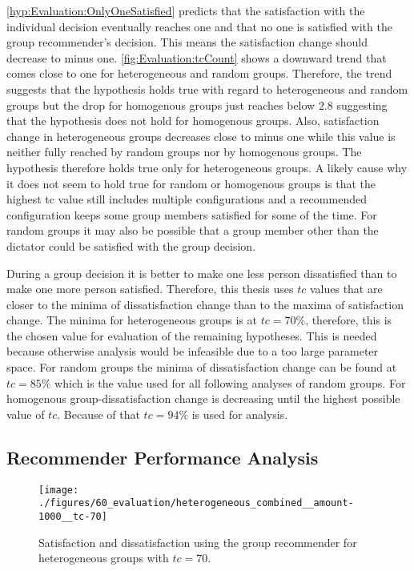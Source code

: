 \autoref{hyp:Evaluation:OnlyOneSatisfied} predicts that the satisfaction with the individual decision eventually reaches one and that no one is satisfied with the group recommender's decision. This means the satisfaction change should decrease to minus one. \autoref{fig:Evaluation:tcCount} shows a downward trend that comes close to one for heterogeneous and random groups. Therefore, the trend suggests that the hypothesis holds true with regard to heterogeneous and random groups but the drop for homogenous groups just reaches below $2.8$ suggesting that the hypothesis does not hold for homogenous groups. Also, satisfaction change in heterogeneous groups decreases close to minus one while this value is neither fully reached by random groups nor by homogenous groups. The hypothesis therefore holds true only for heterogeneous groups. A likely cause why it does not seem to hold true for random or homogenous groups is that the highest tc value still includes multiple configurations and a recommended configuration keeps some group members satisfied for some of the time. For random groups it may also be possible that a group member other than the dictator could be satisfied with the group decision.

During a group decision it is better to make one less person dissatisfied than to make one more person satisfied. Therefore, this thesis uses $tc$ values that are closer to the minima of dissatisfaction change than to the maxima of satisfaction change. The minima for heterogeneous groups is at $tc = 70\%$, therefore, this is the chosen value for evaluation of the remaining hypotheses. This is needed because otherwise analysis would be infeasible due to a too large parameter space. For random groups the minima of dissatisfaction change can be found at $tc = 85\%$ which is the value used for all following analyses of random groups. For homogenous group-dissatisfaction change is decreasing until the highest possible value of $tc$. Because of that $tc = 94\%$ is used for analysis.

\subsection{Recommender Performance Analysis}

\begin{figure}[p]
    \centering
    \texttt{[image: ./figures/60\_evaluation/heterogeneous\_combined\_\_amount-1000\_\_tc-70]}
    \caption[Satisfaction and Dissatisfaction: Heterogeneous Groups]{Satisfaction and dissatisfaction using the group recommender for heterogeneous groups with $tc = 70$.}
    \label{fig:Evaluation:HeteroSatisfaction}
\end{figure}

